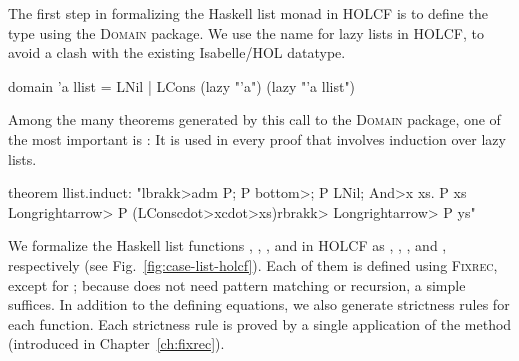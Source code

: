 The first step in formalizing the Haskell list monad in HOLCF is to define the type using the \textsc{Domain} package. We use the name  for lazy lists in HOLCF, to avoid a clash with the existing Isabelle/HOL  datatype.
%
\begin{isacode}
domain 'a llist = LNil | LCons (lazy "'a") (lazy "'a llist")
\end{isacode}
%
Among the many theorems generated by this call to the \textsc{Domain} package, one of the most important is : It is used in every proof that involves induction over lazy lists.
%
\begin{isacode}
theorem llist.induct:
  "\<lbrakk>adm P; P \<bottom>; P LNil; \<And>x xs. P xs \<Longrightarrow> P (LCons\<cdot>x\<cdot>xs)\<rbrakk> \<Longrightarrow> P ys"
\end{isacode}

We formalize the Haskell list functions , , \hs{(++)}, and \hs{(>{}>=)} in HOLCF as , , , and , respectively (see Fig.~\ref{fig:case-list-holcf}). Each of them is defined using \textsc{Fixrec}, except for ; because  does not need pattern matching or recursion, a simple  suffices. In addition to the defining equations, we also generate strictness rules for each function. Each strictness rule is proved by a single application of the  method (introduced in Chapter~\ref{ch:fixrec}).

